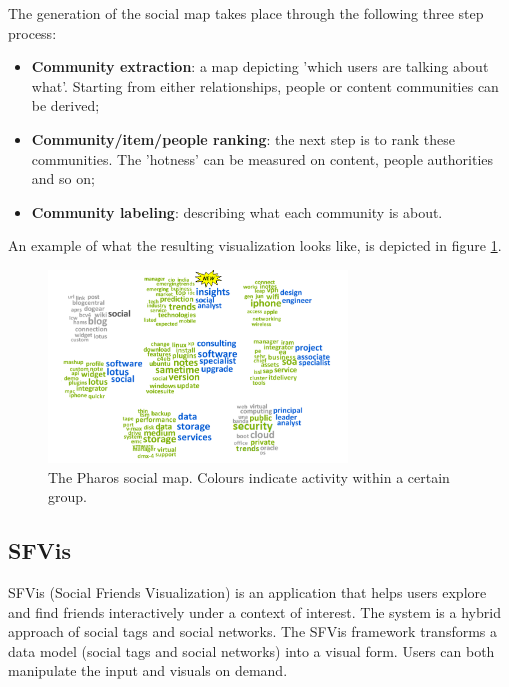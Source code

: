 The generation of the social map takes place through the following three step process:

\begin{itemize}
	\item \textbf{Community extraction}: a map depicting 'which users are talking about what'. Starting from either relationships, people or content communities can be derived;
	\item \textbf{Community/item/people ranking}: the next step is to rank these communities. The 'hotness' can be measured on content, people authorities and so on;
	\item \textbf{Community labeling}: describing what each community is about.
\end{itemize}

An example of what the resulting visualization looks like, is depicted in figure \ref{figure:pharos}.

\begin{figure}%
	\begin{center}
		\includegraphics[width=300px]{img/pharos}%
	\end{center}
	\caption{The Pharos social map. Colours indicate activity within a certain group.}%
	\label{figure:pharos}%
\end{figure}




\subsection{SFVis}\label{chapter:survey:section:applications:subsection:sfvis}

SFVis (Social Friends Visualization) is an application that helps users explore and find friends interactively under a context of interest. The system is a hybrid approach of social tags and social networks. The SFVis framework transforms a data model (social tags and social networks) into a visual form. Users can both manipulate the input and visuals on demand.

